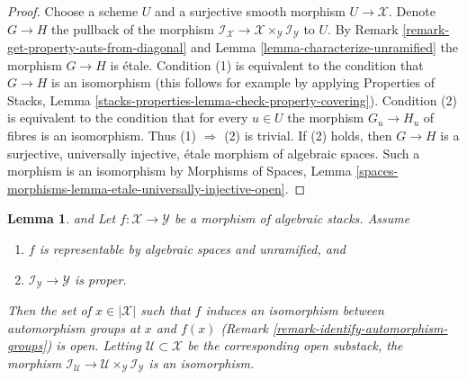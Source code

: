 \documentclass{stacks-project}
\newenvironment{reference}{\comment}{\endcomment}
\theoremstyle{plain}
\newtheorem{lemma}[subsection]{Lemma}
\theoremstyle{definition}
\theoremstyle{remark}
\numberwithin{equation}{subsection}
\begin{document}
\begin{proof}
Choose a scheme $U$ and a surjective smooth morphism $U \to \mathcal{X}$.
Denote $G \to H$ the pullback of the morphism
$\mathcal{I}_\mathcal{X} \to
\mathcal{X} \times_\mathcal{Y} \mathcal{I}_\mathcal{Y}$
to $U$. By Remark \ref{remark-get-property-auts-from-diagonal} and
Lemma \ref{lemma-characterize-unramified} the morphism $G \to H$ is \'etale.
Condition (1) is equivalent to the condition that
$G \to H$ is an isomorphism (this follows for example by applying
Properties of Stacks, Lemma
\ref{stacks-properties-lemma-check-property-covering}).
Condition (2) is equivalent to the condition that
for every $u \in U$ the morphism $G_u \to H_u$ of fibres
is an isomorphism. Thus (1) $\Rightarrow$ (2) is trivial.
If (2) holds, then $G \to H$ is a surjective, universally injective,
\'etale morphism of algebraic spaces. Such a morphism is an isomorphism by
Morphisms of Spaces, Lemma
\ref{spaces-morphisms-lemma-etale-universally-injective-open}.
\end{proof}

\begin{lemma}
\label{lemma-stabilizer-preserving-unramified}
\begin{reference}
\cite[Proposition 3.5]{rydh_quotients} and
\cite[Proposition 2.5]{alper_quotient}
\end{reference}
Let $f : \mathcal{X} \to \mathcal{Y}$ be a morphism of algebraic stacks.
Assume
\begin{enumerate}
\item $f$ is representable by algebraic spaces and unramified, and
\item $\mathcal{I}_\mathcal{Y} \to \mathcal{Y}$ is proper.
\end{enumerate}
Then the set of $x \in |\mathcal{X}|$ such that $f$ induces an
isomorphism between automorphism groups at $x$ and $f(x)$
(Remark \ref{remark-identify-automorphism-groups}) is open.
Letting $\mathcal{U} \subset \mathcal{X}$ be the corresponding open substack,
the morphism
$\mathcal{I}_\mathcal{U} \to
\mathcal{U} \times_\mathcal{Y} \mathcal{I}_\mathcal{Y}$
is an isomorphism.
\end{lemma}
\end{document}
